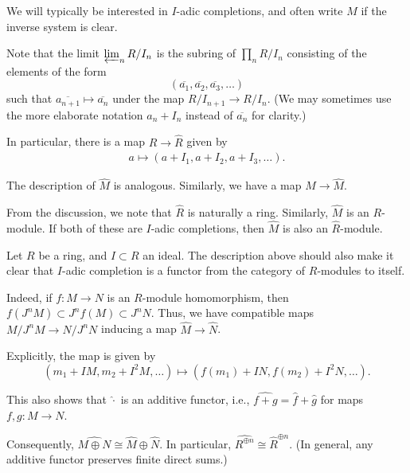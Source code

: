 \documentclass[12pt]{article}
\begin{document}
We will typically be interested in $I$-adic completions, and often write $\widehat{M}$ if the inverse system is clear.

Note that the limit $\varprojlim_{n} R/I_{n}$ is the subring of $\prod_{n} R/I_{n}$ consisting of the elements of the form
\begin{equation*} 
	(\overline{a_{1}}, \overline{a_{2}}, \overline{a_{3}}, \ldots)
\end{equation*}
such that $\overline{a_{n + 1}} \mapsto \overline{a_{n}}$ under the map $R/I_{n + 1} \to R/I_{n}$. (We may sometimes use the more elaborate notation $a_{n} + I_{n}$ instead of $\overline{a_{n}}$ for clarity.)

In particular, there is a map $R \to \widehat{R}$ given by
\begin{align*} 
	a \mapsto (a + I_{1}, a + I_{2}, a + I_{3}, \ldots).
\end{align*}

The description of $\widehat{M}$ is analogous. Similarly, we have a map $M \to \widehat{M}$.

\begin{rem}
	From the discussion, we note that $\widehat{R}$ is naturally a ring. Similarly, $\widehat{M}$ is an $R$-module. If both of these are $I$-adic completions, then $\widehat{M}$ is also an $\widehat{R}$-module.
\end{rem}

\begin{obs} \label{obs:completion-additive-functor}
	Let $R$ be a ring, and $I \subset R$ an ideal. The description above should also make it clear that $I$-adic completion is a functor from the category of $R$-modules to itself.

	Indeed, if $f : M \to N$ is an $R$-module homomorphism, then $f(J^{n} M) \subset J^{n} f(M) \subset J^{n} N$. \newline
	Thus, we have compatible maps $M/J^{n} M \to N/J^{n} N$ inducing a map $\widehat{M} \to \widehat{N}$.

	Explicitly, the map is given by
	\begin{equation*} 
		(m_{1} + I M, m_{2} + I^{2} M, \ldots) \mapsto (f(m_{1}) + I N, f(m_{2}) + I^{2} N, \ldots).
	\end{equation*}

	This also shows that $\widehat{\cdot}$ is an additive functor, i.e., $\widehat{f + g} = \widehat{f} + \widehat{g}$ for maps $f, g : M \to N$.

	Consequently, $\widehat{M \oplus N} \cong \widehat{M} \oplus \widehat{N}$. In particular, $\widehat{R^{\oplus n}} \cong \widehat{R}^{\oplus n}$. (In general, any additive functor preserves finite direct sums.)
\end{obs}
\end{document}
